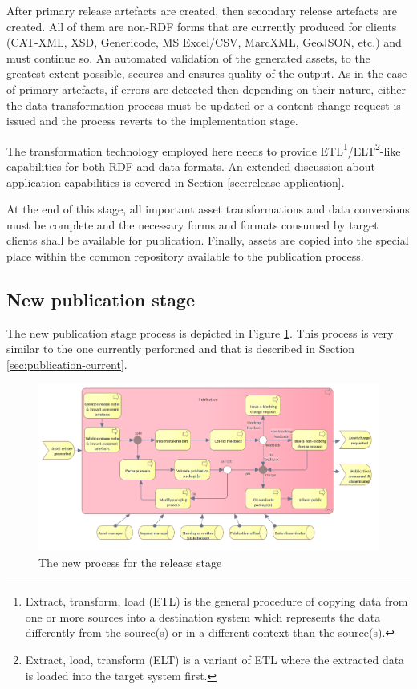 	After primary release artefacts are created, then secondary release artefacts are created. All of them are non-RDF forms that are currently produced for clients (CAT-XML, XSD, Genericode, MS Excel/CSV, MarcXML, GeoJSON, etc.) and must continue so. An automated validation of the generated assets, to the greatest extent possible, secures and ensures quality of the output. As in the case of primary artefacts, if errors are detected then depending on their nature, either the data transformation process must be updated or a content change request is issued and the process reverts to the implementation stage. 
	
	The transformation technology employed here needs to provide ETL\footnote{Extract, transform, load (ETL) is the general procedure of copying data from one or more sources into a destination system which represents the data differently from the source(s) or in a different context than the source(s).}/ELT\footnote{Extract, load, transform (ELT) is a variant of ETL where the extracted data is loaded into the target system first.}-like capabilities for both RDF and data formats. An extended discussion about application capabilities is covered in Section \ref{sec:release-application}.
	
	At the end of this stage, all important asset transformations and data conversions must be complete and the necessary forms and formats consumed by target clients shall be available for publication. Finally, assets are copied into the special place within the common repository available to the publication process. 
	
	\subsection{New publication stage}
	\label{sec:publication-new}
	
	The new publication stage process is depicted in Figure \ref{fig:publication-new}. This process is very similar to the one currently performed and that is described in Section \ref{sec:publication-current}.
	
	\begin{figure}[h]
		\centering
		\includegraphics[width=1.05\textwidth]{images/business/new/Publication.png}
		\caption{The new process for the release stage}
		\label{fig:publication-new}
	\end{figure}

